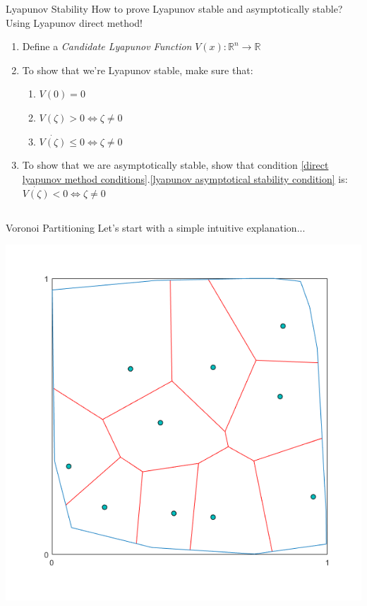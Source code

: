 \documentclass[t]{beamer}
\begin{document}
\begin{frame}[label=lyapunovstability2]{Lyapunov Stability}
How to prove Lyapunov stable and asymptotically stable? Using Lyapunov direct method!
\begin{enumerate}
\item<1-> Define a \textit{Candidate Lyapunov Function} $V(x):\mathbb{R}^{n}\rightarrow\mathbb{R}$
\item<2-> To show that we're Lyapunov stable, make sure that: \label{direct lyapunov method conditions}\begin{enumerate}
\item $V(0) = 0$
\item $V(\zeta)>0 \Leftrightarrow \zeta \neq 0$
\item $\dot{V(\zeta)} \leq 0 \Leftrightarrow \zeta \neq 0 $ \label{lyapunov asymptotical stability condition}
\end{enumerate}
\item<3-> To show that we are asymptotically stable, show that condition \ref{direct lyapunov method conditions}.\ref{lyapunov asymptotical stability condition} is: $\dot{V(\zeta)} < 0 \Leftrightarrow \zeta \neq 0 $
\end{enumerate}
\end{frame}

\subsection[Voronoi Partitioning]{}
\begin{frame}[label=vorpart1]{Voronoi Partitioning}
Let's start with a simple intuitive explanation...
\begin{center}
\includegraphics[scale=0.4]{Voronoi-example.png}
\end{center}
\end{frame}
\end{document}
